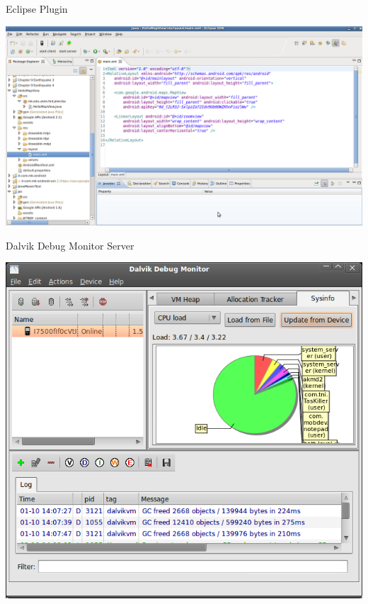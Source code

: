 \begin{frame}{Eclipse Plugin}
\begin{center}
\includegraphics[scale=0.25]{images/eclipse}
\end{center}
\end{frame}

\begin{frame}{Dalvik Debug Monitor Server}
\begin{center}
\includegraphics[scale=0.25]{images/ddms}
\end{center}
\end{frame}

